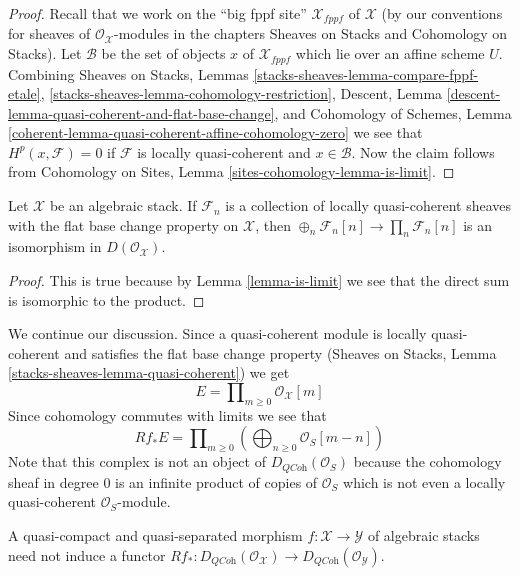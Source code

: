 \begin{proof}
Recall that we work on the ``big fppf site'' $\mathcal{X}_{fppf}$
of $\mathcal{X}$ (by our conventions
for sheaves of $\mathcal{O}_\mathcal{X}$-modules in the chapters
Sheaves on Stacks and Cohomology on Stacks). Let $\mathcal{B}$ be the set
of objects $x$ of $\mathcal{X}_{fppf}$ which lie over an affine scheme $U$. 
Combining
Sheaves on Stacks, Lemmas
\ref{stacks-sheaves-lemma-compare-fppf-etale},
\ref{stacks-sheaves-lemma-cohomology-restriction},
Descent, Lemma \ref{descent-lemma-quasi-coherent-and-flat-base-change},
and
Cohomology of Schemes, Lemma
\ref{coherent-lemma-quasi-coherent-affine-cohomology-zero}
we see that $H^p(x, \mathcal{F}) = 0$ if $\mathcal{F}$ is
locally quasi-coherent and $x \in \mathcal{B}$.
Now the claim follows from
Cohomology on Sites, Lemma \ref{sites-cohomology-lemma-is-limit}.
\end{proof}

\begin{lemma}
\label{lemma-sum-is-product}
Let $\mathcal{X}$ be an algebraic stack. If $\mathcal{F}_n$ is a collection
of locally quasi-coherent sheaves with the flat base change property on
$\mathcal{X}$, then $\oplus_n \mathcal{F}_n[n] \to \prod_n \mathcal{F}_n[n]$
is an isomorphism in $D(\mathcal{O}_\mathcal{X})$.
\end{lemma}

\begin{proof}
This is true because by Lemma \ref{lemma-is-limit} we see that the direct sum
is isomorphic to the product.
\end{proof}

\noindent
We continue our discussion. Since a quasi-coherent module is locally
quasi-coherent and satisfies the flat base change property
(Sheaves on Stacks, Lemma \ref{stacks-sheaves-lemma-quasi-coherent}) we get
$$
E = \prod\nolimits_{m \geq 0} \mathcal{O}_\mathcal{X}[m]
$$
Since cohomology commutes
with limits we see that
$$
Rf_*E = \prod\nolimits_{m \geq 0}
\left(\bigoplus\nolimits_{n \geq 0} \mathcal{O}_S[m - n]\right)
$$
Note that this complex is not an object of $D_{\textit{QCoh}}(\mathcal{O}_S)$
because the cohomology sheaf in degree $0$ is an infinite product of copies
of $\mathcal{O}_S$ which is not even a locally quasi-coherent
$\mathcal{O}_S$-module.

\begin{lemma}
\label{lemma-push-not-OK}
A quasi-compact and quasi-separated morphism
$f : \mathcal{X} \to \mathcal{Y}$ of algebraic stacks
need not induce a functor
$Rf_* : D_{\textit{QCoh}}(\mathcal{O}_\mathcal{X}) \to
D_{\textit{QCoh}}(\mathcal{O}_\mathcal{Y})$.
\end{lemma}

